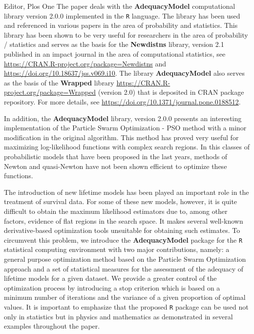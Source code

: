 \documentclass[a4paper, 10pt]{letter}
\begin{document}
\begin{letter}{Editor, Plos One}
		The paper deals with the \textbf{AdequacyModel} computational library version 2.0.0 implemented in the \texttt{R} language. The library has been used and referenced in various papers in the area of probability and statistics. This library has been shown to be very useful for researchers in the area of probability / statistics and serves as the basis for the \textbf{Newdistns} library, version 2.1 published in an impact journal in the area of computational statistics, see \url{https://CRAN.R-project.org/package=Newdistns} and \url{https://doi.org/10.18637/jss.v069.i10}. The library \textbf{AdequacyModel} also serves as the basis of the \textbf{Wrapped} library \url{https://CRAN.R-project.org/package=Wrapped} (version 2.0) that is deposited in CRAN package repository. For more details, see \url{ https://doi.org/10.1371/journal.pone.0188512}.
			
			In addition, the \textbf{AdequacyModel} library, version 2.0.0 presents an interesting implementation of the Particle Swarm Optimization - PSO method with a minor modification in the original algorithm. This method has proved very useful for maximizing log-likelihood functions with complex search regions. In this classes of probabilistic models that have been proposed in the last years, methods of Newton and quasi-Newton have not been shown efficient to optimize these functions.
			
			The introduction of new lifetime models has been played an important role in the treatment of survival data. For some of these new models, however, it is quite difficult to obtain the maximum likelihood estimators due to, among other factors, evidence of flat regions in the search space.  It makes several well-known derivative-based optimization tools unsuitable for obtaining such estimates. To circumvent this problem, we introduce the \textbf{AdequacyModel} package for the \texttt{R} statistical computing environment with two major contributions, namely: a general purpose optimization method based on the Particle Swarm Optimization approach and a set of statistical measures for the assessment of the adequacy of lifetime models for a given dataset. We provide a greater control of the optimization process by introducing a stop criterion which is based on a minimum number of iterations and the variance of a given proportion of optimal values. It is important to emphasize that the proposed \texttt{R} package can be used not only in statistics but in physics and mathematics as demonstrated in several examples throughout the paper. 
			

\end{letter}
\end{document}
